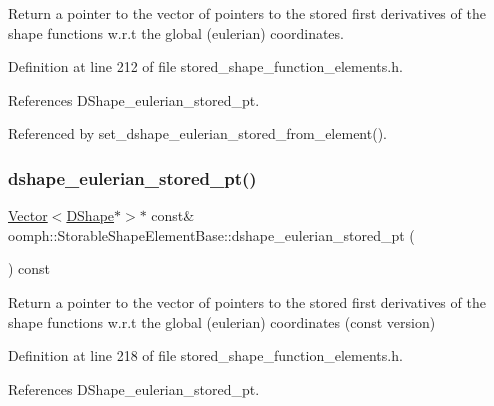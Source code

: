 Return a pointer to the vector of pointers to the stored first derivatives of the shape functions w.\+r.\+t the global (eulerian) coordinates. 



Definition at line 212 of file stored\+\_\+shape\+\_\+function\+\_\+elements.\+h.



References D\+Shape\+\_\+eulerian\+\_\+stored\+\_\+pt.



Referenced by set\+\_\+dshape\+\_\+eulerian\+\_\+stored\+\_\+from\+\_\+element().

\mbox{\label{classoomph_1_1StorableShapeElementBase_a2749bd3901bf30859e463c2342161fbe}} 
\subsubsection{\texorpdfstring{dshape\+\_\+eulerian\+\_\+stored\+\_\+pt()}{dshape\_eulerian\_stored\_pt()}\hspace{0.1cm}{\footnotesize\ttfamily [2/2]}}
{\footnotesize\ttfamily \hyperlink{classoomph_1_1Vector}{Vector}$<$\hyperlink{classoomph_1_1DShape}{D\+Shape}$\ast$$>$$\ast$ const\& oomph\+::\+Storable\+Shape\+Element\+Base\+::dshape\+\_\+eulerian\+\_\+stored\+\_\+pt (\begin{DoxyParamCaption}{ }\end{DoxyParamCaption}) const\hspace{0.3cm}{\ttfamily [inline]}}



Return a pointer to the vector of pointers to the stored first derivatives of the shape functions w.\+r.\+t the global (eulerian) coordinates (const version) 



Definition at line 218 of file stored\+\_\+shape\+\_\+function\+\_\+elements.\+h.



References D\+Shape\+\_\+eulerian\+\_\+stored\+\_\+pt.

\mbox{\label{classoomph_1_1StorableShapeElementBase_a94e5818f75717febe8af072351543811}} 
